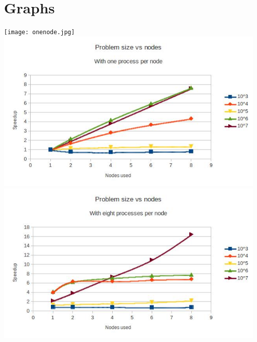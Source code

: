 \documentclass[12pt]{article}
\begin{document}
\section{Graphs}
\texttt{[image: onenode.jpg]}
\includegraphics[width=\textwidth]{oneproc.jpg}
\includegraphics[width=\textwidth]{eightproc.jpg}
\end{document}
